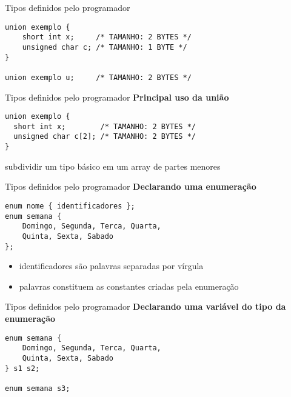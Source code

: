 \documentclass[10pt]{beamer}
\begin{document}
\begin{frame}[fragile]{Tipos definidos pelo programador}
    \large
    \begin{verbatim}
union exemplo {
    short int x;     /* TAMANHO: 2 BYTES */
    unsigned char c; /* TAMANHO: 1 BYTE */
}

union exemplo u;     /* TAMANHO: 2 BYTES */
    \end{verbatim}
\end{frame}

\begin{frame}[fragile]{Tipos definidos pelo programador}
    \huge
    \textbf{Principal uso da união}

    \bigskip

    \large
    \begin{verbatim}
union exemplo {
  short int x;        /* TAMANHO: 2 BYTES */
  unsigned char c[2]; /* TAMANHO: 2 BYTES */
}
    \end{verbatim}

    subdividir um tipo básico em um array de partes menores
\end{frame}

\begin{frame}[fragile]{Tipos definidos pelo programador}
    \huge
    \textbf{Declarando uma enumeração}

    \bigskip

    \large
    \begin{verbatim}
enum nome { identificadores };
enum semana {
    Domingo, Segunda, Terca, Quarta,
    Quinta, Sexta, Sabado
};
    \end{verbatim}

    \large
    \setlength{\leftmargini}{0pt}
    \begin{itemize}
        \item [] identificadores são palavras separadas por vírgula
        \item [] palavras constituem as constantes criadas pela enumeração
    \end{itemize}
\end{frame}


\begin{frame}[fragile]{Tipos definidos pelo programador}
    \huge
    \textbf{Declarando uma variável do tipo da enumeração}

    \bigskip

    \large
    \begin{verbatim}
enum semana {
    Domingo, Segunda, Terca, Quarta,
    Quinta, Sexta, Sabado
} s1 s2;

enum semana s3;
    \end{verbatim}
\end{frame}
\end{document}
